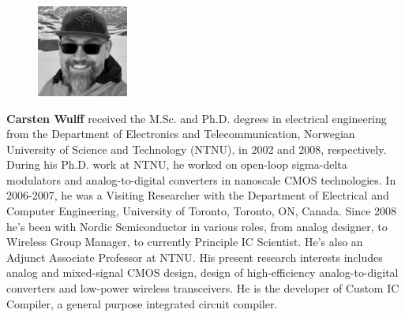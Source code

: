 
\begin{figure}
\centerline{\includegraphics[width=30mm]{wulff} }
\end{figure}
 \textbf{Carsten Wulff}
received the M.Sc. and Ph.D. degrees in
electrical engineering from the Department of Electronics and Telecommunication, Norwegian University of Science and Technology (NTNU),
in 2002 and 2008, respectively. 
During his Ph.D. work at NTNU, he worked on open-loop sigma-delta
modulators and analog-to-digital converters in nanoscale CMOS
technologies. In 2006-2007, he was a Visiting Researcher with the
Department of Electrical and Computer Engineering, University of
Toronto, Toronto, ON, Canada. Since 2008 he's been with Nordic Semiconductor in
various roles, from analog designer, to Wireless Group Manager, to currently
Principle IC Scientist. He's also an Adjunct Associate Professor at NTNU. His
present research interests includes analog and mixed-signal CMOS
design, design of high-efficiency analog-to-digital converters and
low-power wireless transceivers. He is the developer of Custom IC
Compiler, a general purpose integrated circuit compiler.
%
\
